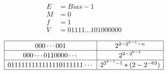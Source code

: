 {\begin{practicec}
\begin{enumerate}[A.]
{                \begin{align*}
                    E &= Bias - 1 \\
                    M &= 0 \\
                    f &= 1 \\
                    V &= 0 1111...101 000000
                \end{align*}
            }
        \end{enumerate}
    \end{practicec}

    \begin{practicec}
        \begin{table}[H]
            \[
                \begin{array}{|c|c|}
                    \hline
                    000\cdots001 & 2^{2 - 2^{k - 1} -n} \\
                    \hline
                    000\cdots0110000\cdots & 2^{2 - 2^{k - 1}} \\
                    \hline
                    0111111111111110111111\cdots & 2^{2^{k - 1} -1} * (2 - 2^{-63}) \\
                    \hline
                \end{array}
            \]
        \end{table}
    \end{practicec}
}
